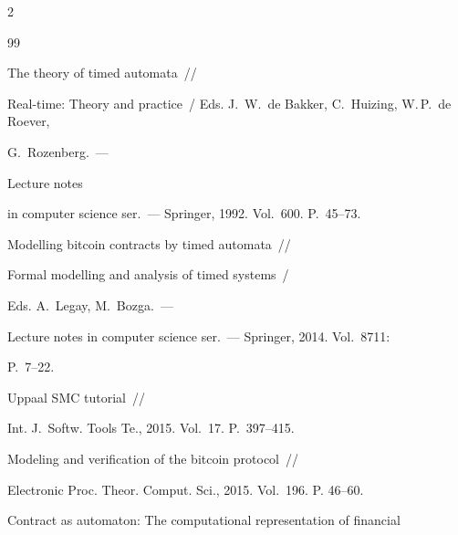 \begin{multicols}{2}
{{\begin{thebibliography}{99}




 The theory of timed automata~//


 Real-time: Theory and practice~/ Eds. J.~W.~de Bakker, C.~Huizing, W.\,P.~de Roever, 


 G.~Rozenberg.~---


Lecture notes


in computer science ser.~--- Springer, 1992. Vol.~600.  P.~45--73.









Modelling bitcoin contracts by timed automata~//


Formal modelling and analysis of timed systems~/


Eds. A.~Legay, M.~Bozga.~---


Lecture notes in computer science ser.~--- Springer, 2014. Vol.~8711: 


 P.~7--22.









Uppaal SMC tutorial~//


{Int. J.~Softw. Tools Te.}, 2015. Vol.~17. P.~397--415.









Modeling and verification of the bitcoin protocol~//


Electronic Proc. Theor. Comput. Sci., 2015. Vol.~196. P. 46--60.











Contract as automaton: The computational representation of financial



\end{thebibliography}}}
\end{multicols}
